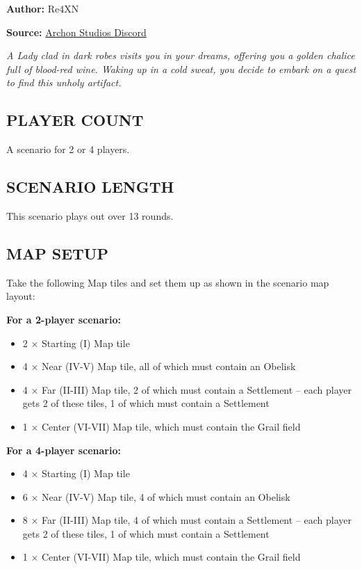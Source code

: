 
\begin{multicols*}{2}

\textbf{Author:} Re4XN

\textbf{Source:} \href{https://discord.com/channels/740870068178649108/1239631918643941509}{Archon Studios Discord}

\textit{A Lady clad in dark robes visits you in your dreams, offering you a golden chalice full of blood-red wine. Waking up in a cold sweat, you decide to embark on a quest to find this unholy artifact.}

\subsection*{\MakeUppercase{Player Count}}
A scenario for 2 or 4 players.

\subsection*{\MakeUppercase{Scenario Length}}
This scenario plays out over 13 rounds.

\subsection*{\MakeUppercase{Map Setup}}
Take the following Map tiles and set them up as shown in the scenario map layout:

\textbf{For a 2-player scenario:}
\begin{itemize}
    \item 2 × Starting (I) Map tile
    \item 4 × Near (IV-V) Map tile, all of which must contain an Obelisk
    \item 4 × Far (II-III) Map tile, 2 of which must contain a Settlement – each player gets 2 of these tiles, 1 of which must contain a Settlement
    \item 1 × Center (VI-VII) Map tile, which must contain the Grail field
\end{itemize}

\textbf{For a 4-player scenario:}
\begin{itemize}
    \item 4 × Starting (I) Map tile
    \item 6 × Near (IV-V) Map tile, 4 of which must contain an Obelisk
    \item 8 × Far (II-III) Map tile, 4 of which must contain a Settlement – each player gets 2 of these tiles, 1 of which must contain a Settlement
    \item 1 × Center (VI-VII) Map tile, which must contain the Grail field
\end{itemize}


\end{multicols*}
